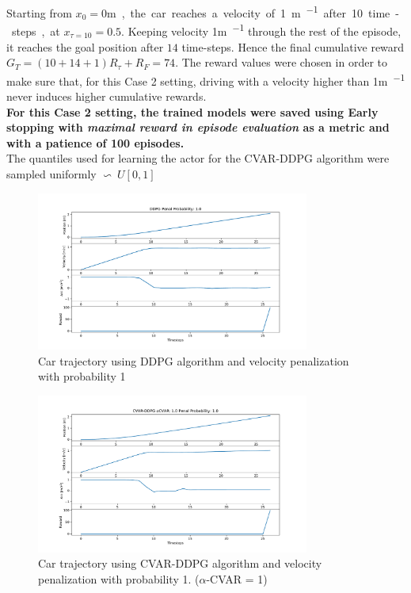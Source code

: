 Starting from $x_0=0$\si\metre, the car reaches a velocity of 1\si{\metre\per\ts} after 10 time-steps, at $x_{\tau=10}=0.5$. Keeping velocity 1\si{\metre\per\ts} through the rest of the episode,
it reaches the goal position after $14$ time-steps. Hence the final cumulative reward $G_T= (10+14+1) R_{\tau} + R_{F}=74$.
The reward values were chosen in order to make sure that, for this Case 2 setting, driving with a velocity higher than 1\si{\metre\per\ts} never induces higher cumulative rewards.\\

\textbf{For this Case 2 setting, the trained models were saved using Early stopping with \textit{maximal reward in episode evaluation} as a metric and with a patience of 100 episodes.}\\
The quantiles used for learning the actor for the CVAR-DDPG algorithm were sampled uniformly $\backsim\ U[0,1] $

\begin{figure}[ht]
        \centering
        \includegraphics[width=0.8\textwidth]{images/DDPG/Trajectory_DDPG_ppenal1.pdf}
        \caption{Car trajectory using DDPG algorithm and velocity penalization with probability 1 }
        \label{traj1_ddpg_probpenal1}
    
\end{figure}


\begin{figure}[ht]
        \centering
        \includegraphics[width=0.8\textwidth]{images/CVAR/Trajectory_CVAR_ppenal1.pdf}
        \caption{Car trajectory using CVAR-DDPG algorithm and velocity penalization with probability 1. ($\alpha$-CVAR = 1)}
        \label{traj_cvarddpg_probpenal1_cvar1}
    
\end{figure}

